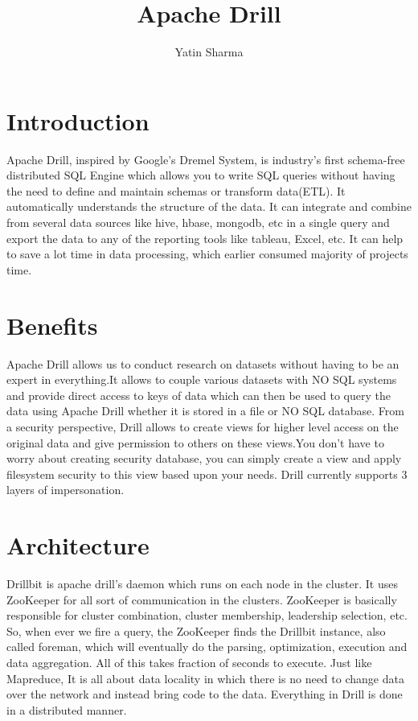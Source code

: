 \documentclass[9pt,twocolumn,twoside]{styles/osajnl}
\title{Apache Drill}
\author[1,*, +]{Yatin Sharma}
\affil[1]{School of Informatics and Computing, Bloomington, IN 47408, U.S.A.}
\affil[*]{Corresponding authors: yatins@indiana.edu}
\affil[+]{HID - S17-IR-3000}
\begin{document}
\maketitle

\section{Introduction}
Apache Drill\cite{Drill}, inspired by Google's Dremel System, is industry's first schema-free distributed SQL Engine which allows you to write SQL queries without having the need to define and maintain schemas or transform data(ETL). It automatically understands the structure of the data. It can integrate and combine from several data sources like hive, hbase, mongodb, etc in a single query and export the data to any of the reporting tools like tableau, Excel, etc. It can help to save a lot time in data processing, which earlier consumed majority of projects time.


\section{Benefits}

Apache Drill allows us to conduct research on datasets without having to be an expert in everything.It allows to couple various datasets with NO SQL systems and provide direct access to keys of data which can then be used to query the data using Apache Drill whether it is stored in a file or NO SQL database.
From a security perspective, Drill allows to create views for higher level access on the original data and give permission to others on these views.You don't have to worry about creating security database, you can simply create a view and apply filesystem security to this view based upon your needs. Drill currently supports 3 layers of impersonation.


\section{Architecture}
Drillbit \cite{Drillbit} is apache drill's daemon which runs on each node in the cluster. It uses ZooKeeper for all sort of communication in the clusters. ZooKeeper is basically responsible for cluster combination, cluster membership, leadership selection, etc. So, when ever we fire a query, the ZooKeeper finds the Drillbit instance, also called foreman, which will eventually do the parsing, optimization, execution and data aggregation. All of this takes fraction of seconds to execute. Just like Mapreduce, It is all about data locality in which there is no need to change data over the network and instead bring code to the data. Everything in Drill is done in a distributed manner.
\end{document}
